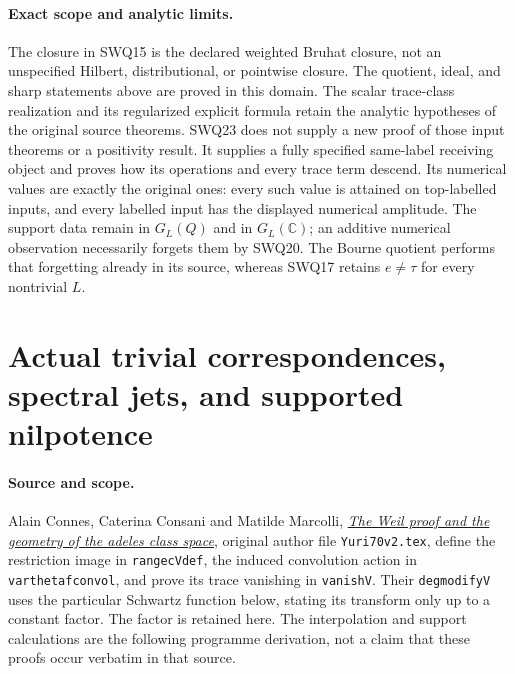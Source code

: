 \documentclass[11pt]{article}
\begin{document}
\paragraph{Exact scope and analytic limits.}
The closure in SWQ15 is the declared weighted Bruhat closure, not
an unspecified Hilbert, distributional, or pointwise closure.
The quotient, ideal, and sharp statements above are proved in this
domain. The scalar trace-class realization and its regularized
explicit formula retain the analytic hypotheses of the original
source theorems. SWQ23 does not supply a new proof of those input
theorems or a positivity result. It supplies a fully specified
same-label receiving object and proves how its operations and every
trace term descend. Its numerical values are exactly the original
ones: every such value is attained on top-labelled inputs, and every
labelled input has the displayed numerical amplitude. The support
data remain in $G_L(Q)$ and in $G_L(\mathbb C)$; an additive
numerical observation necessarily forgets them by SWQ20. The Bourne
quotient performs that forgetting already in its source, whereas
SWQ17 retains $e\ne\tau$ for every nontrivial $L$.

\clearpage

\section{Actual trivial correspondences, spectral jets, and supported nilpotence}
\label{sec:cc-weil-jet-interpolation}

\paragraph{Source and scope.}
Alain Connes, Caterina Consani and Matilde Marcolli,
\href{https://arxiv.org/abs/math/0703392v1}{\emph{The Weil proof and the
geometry of the adeles class space}}, original author file
\texttt{Yuri70v2.tex}, define the restriction image in
\texttt{rangecVdef}, the induced convolution action in
\texttt{varthetafconvol}, and prove its trace vanishing in
\texttt{vanishV}. Their \texttt{degmodifyV} uses the particular
Schwartz function below, stating its transform only up to a
constant factor. The factor is retained here. The interpolation
and support calculations are the following programme derivation,
not a claim that these proofs occur verbatim in that source.
\end{document}
